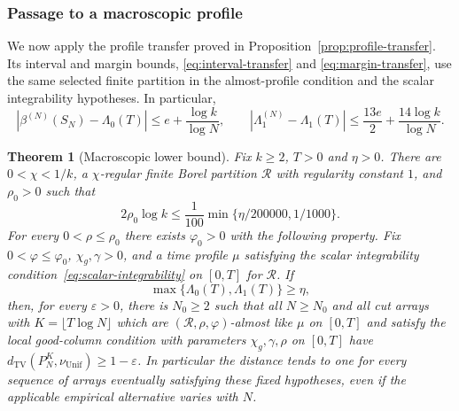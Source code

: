 \documentclass[11pt]{article}
\numberwithin{equation}{section}
\newtheorem{theorem}{Theorem}[section]
\theoremstyle{definition}
\theoremstyle{remark}
\newcommand{\TV}{\mathrm{TV}}
\newcommand{\Unif}{\mathrm{Unif}}
\newcommand{\dTV}{d_{\TV}}
\newcommand{\nuUnif}{\nu_{\Unif}}
\newcommand{\1}{\mathbf 1}
\begin{document}
\subsubsection{Passage to a macroscopic profile}

We now apply the profile transfer proved in Proposition~\ref{prop:profile-transfer}.
Its interval and margin bounds, \eqref{eq:interval-transfer} and
\eqref{eq:margin-transfer}, use the same selected finite partition in the
almost-profile condition and the scalar integrability hypotheses. In particular,
\[
 |\beta^{(N)}(S_N)-\Lambda_0(T)|\le e+\frac{\log k}{\log N},\qquad
 |\Lambda_1^{(N)}-\Lambda_1(T)|\le\frac{13e}{2}+\frac{14\log k}{\log N}.
\]


\begin{theorem}[Macroscopic lower bound]%
\label{thm:macroscopic-lower}
Fix $k\ge2$, $T>0$ and $\eta>0$. There are $0<\chi<1/k$, a $\chi$-regular finite Borel
partition $\mathcal R$ with regularity constant $1$, and $\rho_0>0$ such that
\[
 2\rho_0\log k\le\frac1{100}\min\{\eta/200000,1/1000\}.
\]
For every $0<\rho\le\rho_0$ there exists $\varphi_0>0$ with the following
property. Fix $0<\varphi\le\varphi_0$, $\chi_g,\gamma>0$, and a time
profile $\mu$ satisfying the scalar integrability condition~\eqref{eq:scalar-integrability} on $[0,T]$ for $\mathcal R$. If
\[
 \max\{\Lambda_0(T),\Lambda_1(T)\}\ge\eta,
\]
then, for every $\varepsilon>0$, there is $N_0\ge2$ such that all
$N\ge N_0$ and all cut arrays with $K=\lfloor T\log N\rfloor$ which are
$(\mathcal R,\rho,\varphi)$-almost like $\mu$ on $[0,T]$ and satisfy the local
good-column condition with parameters $\chi_g,\gamma,\rho$ on $[0,T]$
have $\dTV(P_N^K,\nuUnif)\ge1-\varepsilon$. In particular the distance
tends to one for every sequence of arrays eventually satisfying these
fixed hypotheses, even if the applicable empirical alternative varies
with $N$.
\end{theorem}
\end{document}

